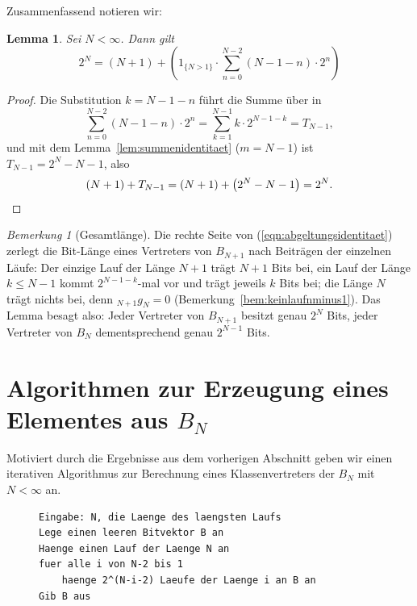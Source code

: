 \documentclass[11pt,a4paper]{scrartcl}
\theoremstyle{plain}
\newtheorem{lemma}[satz]{Lemma}
\theoremstyle{definition}
\theoremstyle{remark}
\newtheorem{bem}[satz]{Bemerkung}
\begin{document}
Zusammenfassend notieren wir:

\begin{lemma}\label{lem:abgeltungsidentitaet}
Sei $N<\infty$. Dann gilt
\begin{equation}\label{eqn:abgeltungsidentitaet}
  2^{N} = \left(N+1\right)+\left( 1_{\{N>1\}}\cdot\sum_{n=0}^{N-2} (N-1-n) \cdot 2^n\right)
\end{equation}
\end{lemma}

\begin{proof}
Die Substitution $k=N-1-n$ führt die Summe über in
\begin{equation*}
  \sum_{n=0}^{N-2}\left(N-1-n\right)\cdot 2^{n}
  =\sum_{k=1}^{N-1}k\cdot 2^{N-1-k}=T_{N-1},
\end{equation*}
und mit dem Lemma~\ref{lem:summenidentitaet} ($m=N-1$) ist
$T_{N-1}=2^{N}-N-1$, also
\begin{equation*}
  \left(N+1\right)+T_{N-1}
  =\left(N+1\right)+\left(2^{N}-N-1\right)=2^{N}.\qedhere
\end{equation*}
\end{proof}

\begin{bem}[Gesamtlänge]\label{bem:gesamtlaenge}
Die rechte Seite von (\ref{eqn:abgeltungsidentitaet}) zerlegt die
Bit-Länge eines Vertreters von $B_{N+1}$ nach Beiträgen der einzelnen
Läufe: Der einzige Lauf der Länge $N+1$ trägt $N+1$ Bits bei, ein Lauf
der Länge $k\leq N-1$ kommt $2^{N-1-k}$-mal vor und trägt jeweils $k$
Bits bei; die Länge $N$ trägt nichts bei, denn $_{N+1}g_N=0$
(Bemerkung~\ref{bem:keinlaufnminus1}). Das Lemma besagt also: Jeder
Vertreter von $B_{N+1}$ besitzt genau $2^{N}$ Bits, jeder Vertreter von
$B_N$ dementsprechend genau $2^{N-1}$ Bits.
\end{bem}

\section{Algorithmen zur Erzeugung eines Elementes aus
\texorpdfstring{$B_N$}{B\_N}}\label{sec:algorithmen}

\noindent Motiviert durch die Ergebnisse aus dem vorherigen Abschnitt
geben wir einen iterativen Algorithmus zur Berechnung eines
Klassenvertreters der $B_N$ mit $N<\infty$ an.

\begin{figure}[htbp]
\begin{lstlisting}[caption={Iterative Erzeugung einer Folge aus B\_N fuer ein beliebiges N},label={algo:iterativ}]
Eingabe: N, die Laenge des laengsten Laufs
Lege einen leeren Bitvektor B an
Haenge einen Lauf der Laenge N an
fuer alle i von N-2 bis 1
    haenge 2^(N-i-2) Laeufe der Laenge i an B an
Gib B aus
\end{lstlisting}
\end{figure}
\end{document}
